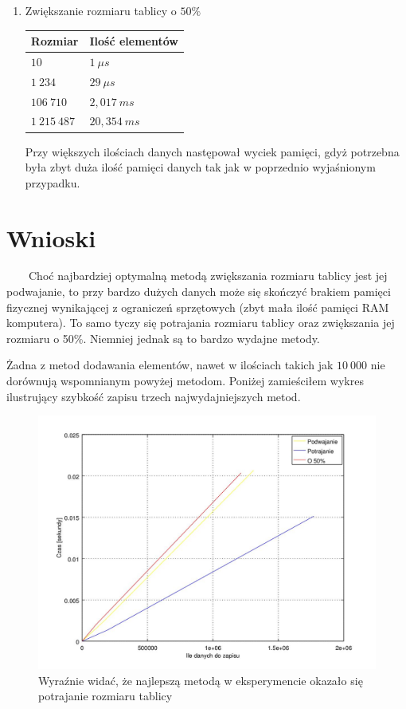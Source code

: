 \documentclass[11pt, a4paper]{article}
\begin{document}
\begin{enumerate}
	\item Zwiększanie rozmiaru tablicy o $50\%$
		\begin{center}
		\begin{tabular}{| p{5cm} | p{5cm} |}
			\hline
			Rozmiar & Ilość elementów \\ \hline
			$10$ & $1\ \mu s$ \\ \hline
            $1\ 234$ & $29\ \mu s$ \\ \hline 
         	$106\ 710$ & $2,017\ ms$ \\ \hline
        		$1\ 215\ 487$ & $20,354\ ms$ \\ \hline  
	    \end{tabular}
	    \end{center}  
   	    Przy większych ilościach danych następował wyciek pamięci, gdyż potrzebna
	    była zbyt duża ilość pamięci danych tak jak w poprzednio wyjaśnionym przypadku.
	    
\end{enumerate}

\section{Wnioski}
\ \ \ \ Choć najbardziej optymalną metodą zwiększania rozmiaru tablicy jest jej podwajanie, to przy bardzo dużych danych może się skończyć brakiem pamięci fizycznej wynikającej z ograniczeń sprzętowych (zbyt mała ilość pamięci RAM komputera). To samo tyczy się potrajania rozmiaru tablicy oraz zwiększania jej rozmiaru o 50\%. Niemniej jednak są to bardzo wydajne metody.

Żadna z metod dodawania elementów, nawet w ilościach takich jak $10\ 000$ nie dorównują wspomnianym powyżej metodom. Poniżej zamieściłem wykres ilustrujący szybkość zapisu trzech najwydajniejszych metod.
\begin{figure}[h]
\begin{center}
\includegraphics[width=1.2\textwidth]{wykres.jpg}
\end{center}
\caption{Wyraźnie widać, że najlepszą metodą w eksperymencie okazało się potrajanie rozmiaru tablicy}
\end{figure}
\end{document}
